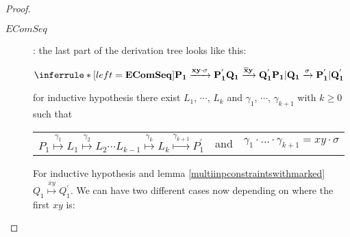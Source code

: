 \begin{proposition}
\begin{proof}
\begin{description}
      \item[$EComSeq$]: 
	the last part of the derivation tree looks like this:
	\begin{center}
	  $\inferrule* [left=\bf{EComSeq}]{
	      P_{1} \xrightarrow{xy \cdot \sigma} P_{1}^{'}
	    \\
	      Q_{1} \xrightarrow{\overline{x}y} Q_{1}^{'}
	  }{
	    P_{1}|Q_{1} \xrightarrow{\sigma} P_{1}^{'}|Q_{1}^{'}
	  }$
	\end{center}
	for inductive hypothesis there exist $L_{1}$, $\cdots$, $L_{k}$ and $\gamma_{1}$, $\cdots$, $\gamma_{k+1}$ with $k\geq 0$ such that 
	\begin{center}
	  \begin{tabular}{lll}
	    $P_{1} \stackrel{\gamma_{1}}{\longmapsto} L_{1}  \stackrel{\gamma_{2}}{\longmapsto} L_{2} \cdots L_{k-1} \stackrel{\gamma_{k}}{\longmapsto} L_{k} \stackrel{\gamma_{k+1}}{\longmapsto} P_{1}^{'}$ 
	  &
	    and
	  &
	    $\gamma_{1} \cdot \ldots \cdot \gamma_{k+1} = xy \cdot \sigma$  
	  \end{tabular}
	\end{center}
	For inductive hypothesis and lemma \ref{multiinpconstraintswithmarked} $Q_{1} \stackrel{\overline{x}y}{\longmapsto} Q_{1}^{'}$. We can have two different cases now depending on where the first $xy$ is:
\end{description}
\end{proof}
\end{proposition}
